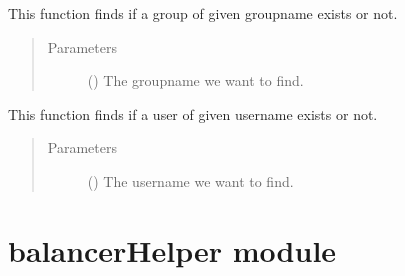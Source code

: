 \documentclass[letterpaper,10pt,english]{sphinxmanual}
\begin{document}

\begin{fulllineitems}
\label{\detokenize{clientHelper:clientHelper.groupExist}}
This function finds if a group of given groupname exists or not.
\begin{quote}\begin{description}
\item[{Parameters}] \leavevmode
{} () \textendash{} The groupname we want to find.

\end{description}\end{quote}

\end{fulllineitems}


\begin{fulllineitems}
\label{\detokenize{clientHelper:clientHelper.userExist}}
This function finds if a user of given username exists or not.
\begin{quote}\begin{description}
\item[{Parameters}] \leavevmode
{} () \textendash{} The username we want to find.

\end{description}\end{quote}

\end{fulllineitems}



\section{balancerHelper module}
\label{\detokenize{balancerHelper:module-balancerHelper}}\label{\detokenize{balancerHelper:balancerhelper-module}}\label{\detokenize{balancerHelper::doc}}
\end{document}
